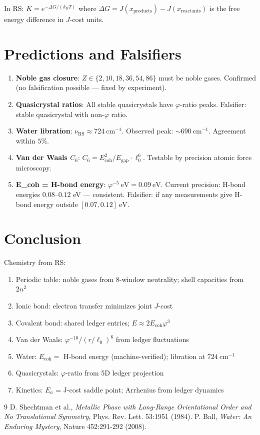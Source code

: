 \documentclass[12pt,a4paper]{article}
\theoremstyle{definition}
\theoremstyle{remark}
\begin{document}
In RS: $K = e^{-\Delta G/(k_B T)}$ where $\Delta G = J(x_\mathrm{products}) - J(x_\mathrm{reactants})$ 
is the free energy difference in $J$-cost units.

\section{Predictions and Falsifiers}

\begin{enumerate}
\item \textbf{Noble gas closure}: $Z \in \{2, 10, 18, 36, 54, 86\}$ must be noble gases. 
Confirmed (no falsification possible — fixed by experiment).

\item \textbf{Quasicrystal ratios}: All stable quasicrystals have $\varphi$-ratio peaks.
Falsifier: stable quasicrystal with non-$\varphi$ ratio.

\item \textbf{Water libration}: $\nu_\mathrm{RS} \approx 724~\mathrm{cm}^{-1}$.
Observed peak: $\sim 690~\mathrm{cm}^{-1}$. Agreement within $5\%$.

\item \textbf{Van der Waals $C_6$}: $C_6 = E_\mathrm{coh}^2/E_\mathrm{gap} \cdot \ell_0^6$.
Testable by precision atomic force microscopy.

\item \textbf{E_coh = H-bond energy}: $\varphi^{-5}~\mathrm{eV} = 0.09~\mathrm{eV}$.
Current precision: H-bond energies $0.08$–$0.12$ eV — consistent. 
Falsifier: if any measurements give H-bond energy outside $[0.07, 0.12]~\mathrm{eV}$.
\end{enumerate}

\section{Conclusion}

Chemistry from RS:
\begin{enumerate}
\item Periodic table: noble gases from 8-window neutrality; shell capacities from $2n^2$
\item Ionic bond: electron transfer minimizes joint $J$-cost
\item Covalent bond: shared ledger entries; $E \approx 2 E_\mathrm{coh} \varphi^3$
\item Van der Waals: $\varphi^{-10}/(r/\ell_0)^6$ from ledger fluctuations
\item Water: $E_\mathrm{coh} = $ H-bond energy (machine-verified); libration at $724~\mathrm{cm}^{-1}$
\item Quasicrystals: $\varphi$-ratio from 5D ledger projection
\item Kinetics: $E_a$ = J-cost saddle point; Arrhenius from ledger dynamics
\end{enumerate}

\begin{thebibliography}{9}
 D. Shechtman et al., \emph{Metallic Phase with Long-Range Orientational Order and No Translational Symmetry}, Phys. Rev. Lett. 53:1951 (1984).
 P. Ball, \emph{Water: An Enduring Mystery}, Nature 452:291-292 (2008).
\end{thebibliography}
\end{document}
